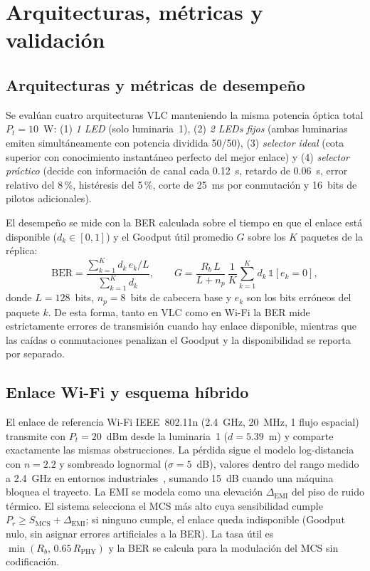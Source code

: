 \documentclass[conference]{IEEEtran}
\begin{document}
\section{Arquitecturas, métricas y validación}

\subsection{Arquitecturas y métricas de desempeño}
Se evalúan cuatro arquitecturas VLC manteniendo la misma potencia óptica total $P_t=10$~W: (1) \emph{1 LED} (solo luminaria~1), (2) \emph{2 LEDs fijos} (ambas luminarias emiten simultáneamente con potencia dividida 50/50), (3) \emph{selector ideal} (cota superior con conocimiento instantáneo perfecto del mejor enlace) y (4) \emph{selector práctico} (decide con información de canal cada 0.12~s, retardo de 0.06~s, error relativo del 8\,\%, histéresis del 5\,\%, corte de 25~ms por conmutación y 16~bits de pilotos adicionales).

El desempeño se mide con la BER calculada sobre el tiempo en que el enlace está disponible ($d_k\in[0,1]$) y el Goodput útil promedio $G$ sobre los $K$ paquetes de la réplica:
\begin{equation}
\mathrm{BER}=\frac{\sum_{k=1}^{K} d_k\,e_k/L}{\sum_{k=1}^{K} d_k},\qquad
G=\frac{R_b\,L}{L+n_p}\,\frac{1}{K}\sum_{k=1}^{K} d_k\,\mathbb{1}[e_k=0],
\label{eq:metricas}
\end{equation}
donde $L=128$~bits, $n_p=8$~bits de cabecera base y $e_k$ son los bits erróneos del paquete $k$. De esta forma, tanto en VLC como en Wi-Fi la BER mide estrictamente errores de transmisión cuando hay enlace disponible, mientras que las caídas o conmutaciones penalizan el Goodput y la disponibilidad se reporta por separado.

\subsection{Enlace Wi-Fi y esquema híbrido}
El enlace de referencia Wi-Fi IEEE~802.11n (2.4~GHz, 20~MHz, 1 flujo espacial)~\cite{ieee80211n} transmite con $P_t=20$~dBm desde la luminaria~1 ($d=5.39$~m) y comparte exactamente las mismas obstrucciones. La pérdida sigue el modelo log-distancia con $n=2.2$ y sombreado lognormal ($\sigma=5$~dB), valores dentro del rango medido a 2.4~GHz en entornos industriales~\cite{tanghe2008}, sumando 15~dB cuando una máquina bloquea el trayecto. La EMI se modela como una elevación $\Delta_{\mathrm{EMI}}$ del piso de ruido térmico. El sistema selecciona el MCS más alto cuya sensibilidad cumple $P_r\ge S_{\mathrm{MCS}}+\Delta_{\mathrm{EMI}}$; si ninguno cumple, el enlace queda indisponible (Goodput nulo, sin asignar errores artificiales a la BER). La tasa útil es $\min(R_b,\,0.65\,R_{\mathrm{PHY}})$ y la BER se calcula para la modulación del MCS sin codificación.
\end{document}
